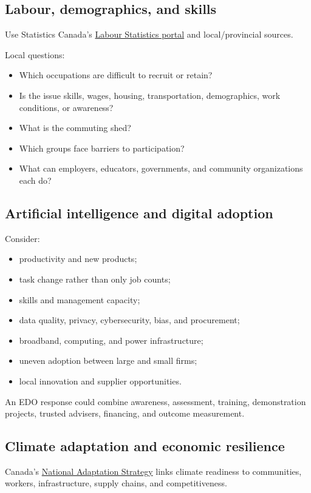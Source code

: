 \documentclass[11pt,letterpaper,oneside,openany]{book}
\begin{document}
\subsection[Labour, demographics, and skills]{Labour, demographics, and skills}
Use Statistics Canada's \href{https://www.statcan.gc.ca/en/subjects-start/labour\_}{Labour Statistics portal} and local/provincial sources.


Local questions:


\begin{itemize}
\item Which occupations are difficult to recruit or retain?
\item Is the issue skills, wages, housing, transportation, demographics, work conditions, or awareness?
\item What is the commuting shed?
\item Which groups face barriers to participation?
\item What can employers, educators, governments, and community organizations each do?
\end{itemize}


\subsection[Artificial intelligence and digital adoption]{Artificial intelligence and digital adoption}
Consider:


\begin{itemize}
\item productivity and new products;
\item task change rather than only job counts;
\item skills and management capacity;
\item data quality, privacy, cybersecurity, bias, and procurement;
\item broadband, computing, and power infrastructure;
\item uneven adoption between large and small firms;
\item local innovation and supplier opportunities.
\end{itemize}


An EDO response could combine awareness, assessment, training, demonstration projects, trusted advisers, financing, and outcome measurement.


\subsection[Climate adaptation and economic resilience]{Climate adaptation and economic resilience}
Canada's \href{https://www.canada.ca/en/services/environment/weather/climatechange/climate-plan/national-adaptation-strategy/full-strategy.html}{National Adaptation Strategy} links climate readiness to communities, workers, infrastructure, supply chains, and competitiveness.
\end{document}
